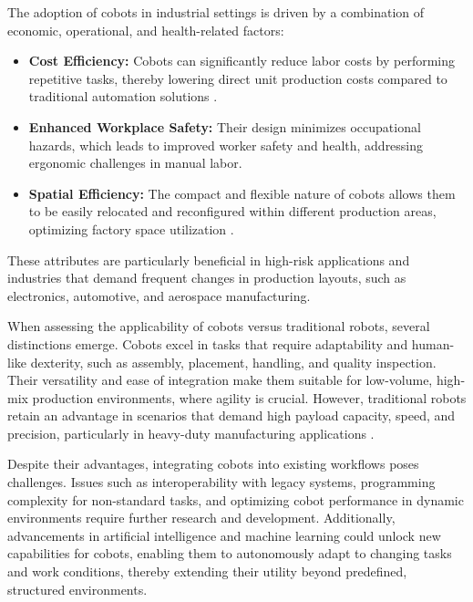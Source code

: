 The adoption of cobots in industrial settings is driven by a combination of economic, operational, and health-related factors:
\begin{itemize}
    \item \textbf{Cost Efficiency:} Cobots can significantly reduce labor costs by performing repetitive tasks, thereby lowering direct unit production costs compared to traditional automation solutions \cite{cobot-2019collaborative}.
    \item \textbf{Enhanced Workplace Safety:} Their design minimizes occupational hazards, which leads to improved worker safety and health, addressing ergonomic challenges in manual labor.
    \item \textbf{Spatial Efficiency:} The compact and flexible nature of cobots allows them to be easily relocated and reconfigured within different production areas, optimizing factory space utilization \cite{cobots-implementation}.
\end{itemize}


These attributes are particularly beneficial in high-risk applications and industries that demand frequent changes in production layouts, such as electronics, automotive, and aerospace manufacturing.

When assessing the applicability of cobots versus traditional robots, several distinctions emerge. Cobots excel in tasks that require adaptability and human-like dexterity, such as assembly, placement, handling, and quality inspection. Their versatility and ease of integration make them suitable for low-volume, high-mix production environments, where agility is crucial. However, traditional robots retain an advantage in scenarios that demand high payload capacity, speed, and precision, particularly in heavy-duty manufacturing applications \cite{robotics8040100}.


Despite their advantages, integrating cobots into existing workflows poses challenges. Issues such as interoperability with legacy systems, programming complexity for non-standard tasks, and optimizing cobot performance in dynamic environments require further research and development. Additionally, advancements in artificial intelligence and machine learning could unlock new capabilities for cobots, enabling them to autonomously adapt to changing tasks and work conditions, thereby extending their utility beyond predefined, structured environments.


